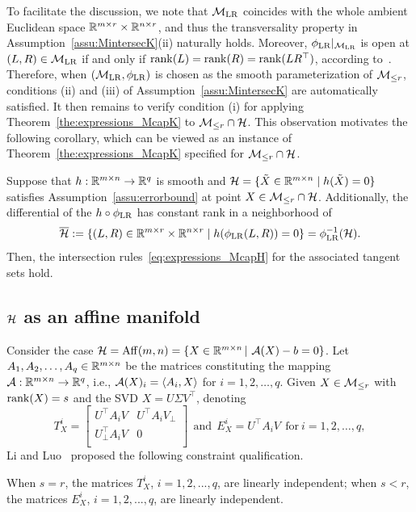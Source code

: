 To facilitate the discussion, we note that $\mathcal{M}_{\mathrm{LR}}$ coincides with the whole ambient Euclidean space $\mathbb{R}^{m\times r}\times \mathbb{R}^{n\times r}$, and thus the transversality property in Assumption~\ref{assu:MintersecK}(ii) naturally holds. Moreover, $\phi_{\mathrm{LR}}|_{\mathcal{M}_{\mathrm{LR}}}$ is open at $(L, R)\in\mathcal{M}_{\mathrm{LR}}$ if and only if $\operatorname{rank}(L) = \operatorname{rank}(R) = \operatorname{rank}(LR^\top)$, according to~\cite[Theorem~2.3, Proposition~2.8]{levin2025effect}. Therefore, when $(\mathcal{M}_{\mathrm{LR}}, \phi_{\mathrm{LR}})$ is chosen as the smooth parameterization of $\mathcal{M}_{\le r}$, conditions (ii) and (iii) of Assumption~\ref{assu:MintersecK} are automatically satisfied. It then remains to verify condition (i) for applying Theorem~\ref{the:expressions_McapK} to $\mathcal{M}_{\le r} \cap \mathcal{H}$. This observation motivates the following corollary, which can be viewed as an instance of Theorem~\ref{the:expressions_McapK} specified for $\mathcal{M}_{\le r}\cap\mathcal{H}$.



\begin{corollary}\label{cor:expressions_MrcapH}
    Suppose that $h:\mathbb{R}^{m\times n}\to\mathbb{R}^q$ is smooth and $\mathcal{H}=\{\tilde{X}\in\mathbb{R}^{m\times n}\mid h(\tilde{X})=0\}$ satisfies Assumption~\ref{assu:errorbound} at point $X\in\mathcal{M}_{\le r}\cap\mathcal{H}$. Additionally, the differential of the $h\circ\phi_{\mathrm{LR}}$ has constant rank in a neighborhood of $$\overline{\mathcal{H}}:=\{(L,R)\in\mathbb{R}^{m\times r}\times \mathbb{R}^{n\times r}\mid h(\phi_{\mathrm{LR}}(L,R))=0\}=\phi_{\mathrm{LR}}^{-1}(\mathcal{H}).$$ Then, the intersection rules~\eqref{eq:expressions_McapH} for the associated tangent sets hold.
\end{corollary}


\subsection{$\mathcal{H}$ as an affine manifold}\label{app:Haffine}
Consider the case $\mathcal{H}=\mathrm{Aff}(m,n)= \{X\in\mathbb{R}^{m\times n}\,|\ \mathcal{A}(X)-b={0}\}$. Let $A_1,A_2,\ldots,A_q\in\mathbb{R}^{m\times n}$ be the matrices constituting the mapping $\mathcal{A}:\mathbb{R}^{m\times n}\to\mathbb{R}^q$, i.e., $\mathcal{A}(X)_i=\langle {A_i,X} \rangle$ for $i=1,2,\ldots,q$. Given $X\in\mathcal{M}_{\le r}$ with $\operatorname{rank}(X)=s$ and the SVD $X=U\varSigma V^\top$, denoting
\begin{equation*}
    T^i_X = \left[ \begin{matrix}
	U^{\top}A_iV&		U^{\top}A_iV_{\bot}\\
	U_{\bot}^{\top}A_iV&		0\\
\end{matrix} \right]\ \ \text{and}\ \ E^i_X=U^\top A_i V\ \ \text{for}\ i=1,2,\ldots,q,
\end{equation*}
Li and Luo~\cite{li2023normalboundedaffine} proposed the following constraint qualification.
\begin{assumption}{\cite[Assumptions~3.3 and 3.4]{li2023normalboundedaffine}}\label{assu:affinemanifold}
    When $s=r$, the matrices $T^i_X$, $i=1,2,...,q$, are linearly independent; when $s<r$, the matrices $E^i_X$, $i=1,2,...,q$, are linearly independent.
\end{assumption}


